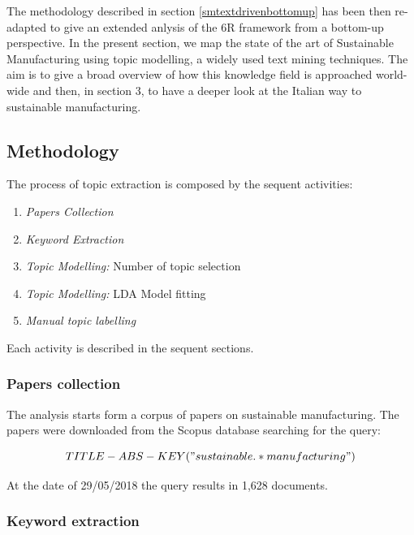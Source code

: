 \documentclass[]{book}
\providecommand{\tightlist}{%
  \setlength{\itemsep}{0pt}\setlength{\parskip}{0pt}}
\begin{document}
The methodology described in section \ref{smtextdrivenbottomup} has been
then re-adapted to give an extended anlysis of the 6R framework from a
bottom-up perspective. In the present section, we map the state of the
art of Sustainable Manufacturing using topic modelling, a widely used
text mining techniques. The aim is to give a broad overview of how this
knowledge field is approached world-wide and then, in section 3, to have
a deeper look at the Italian way to sustainable manufacturing.

\subsection{Methodology}\label{methodology-3}

The process of topic extraction is composed by the sequent activities:

\begin{enumerate}
\def\labelenumi{\arabic{enumi}.}
\tightlist
\item
  \emph{Papers Collection}
\item
  \emph{Keyword Extraction}
\item
  \emph{Topic Modelling:} Number of topic selection
\item
  \emph{Topic Modelling:} LDA Model fitting
\item
  \emph{Manual topic labelling}
\end{enumerate}

Each activity is described in the sequent sections.

\subsubsection*{Papers collection}\label{papers-collection}

The analysis starts form a corpus of papers on sustainable
manufacturing. The papers were downloaded from the Scopus database
searching for the query:

\begin{equation*} 
  TITLE-ABS-KEY("sustainable.*manufacturing")
\end{equation*}

At the date of 29/05/2018 the query results in 1,628 documents.

\subsubsection*{Keyword extraction}\label{keyword-extraction}
\end{document}
